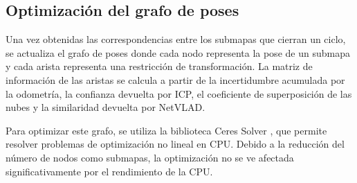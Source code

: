 \subsection{Optimización del grafo de poses}

Una vez obtenidas las correspondencias entre los submapas que cierran un ciclo, se actualiza el grafo de poses donde cada nodo representa la pose de un submapa y cada arista representa una restricción de transformación. La matriz de información de las aristas se calcula a partir de la incertidumbre acumulada por la odometría, la confianza devuelta por ICP, el coeficiente de superposición de las nubes y la similaridad devuelta por NetVLAD.

Para optimizar este grafo, se utiliza la biblioteca Ceres Solver \cite{Agarwal_Ceres_Solver_2022}, que permite resolver problemas de optimización no lineal en CPU. Debido a la reducción del número de nodos como submapas, la optimización no se ve afectada significativamente por el rendimiento de la CPU.